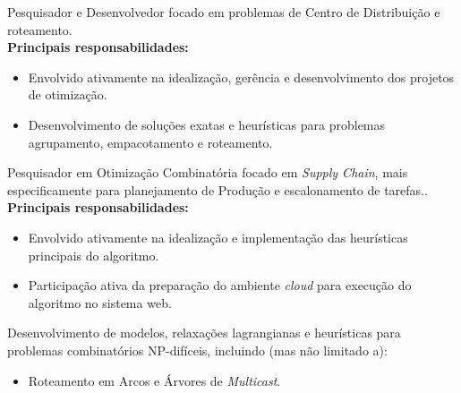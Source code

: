\documentclass[10pt,a4paper,ragged2e,withhyper]{altacv}
\begin{document}
\begin{paracol}{2}
            {Pesquisador e Desenvolvedor focado em problemas de Centro de Distribuição e roteamento}. \\
            \medskip
            \textbf{Principais responsabilidades:}
            \medskip
            \begin{itemize}
                \item Envolvido ativamente na idealização, gerência e desenvolvimento dos projetos de otimização.
                \item Desenvolvimento de soluções exatas e heurísticas para problemas agrupamento, empacotamento e roteamento. 
            \end{itemize}
        \divider
        \medskip
            {Pesquisador em Otimização Combinatória focado em \textit{Supply Chain}, mais especificamente para planejamento de Produção e escalonamento de tarefas.}.\\
            \medskip
            \textbf{Principais responsabilidades:}
            \medskip
            \begin{itemize}
                \item Envolvido ativamente na idealização e implementação das heurísticas principais do algoritmo.
                \item Participação ativa da preparação do ambiente \textit{cloud} para execução do algoritmo no sistema web.
            \end{itemize}
	    {Desenvolvimento de modelos, relaxações lagrangianas e heurísticas para problemas combinatórios NP-difíceis, incluindo (mas não limitado a):} \\
	      \begin{itemize}
		        \item Roteamento em Arcos e Árvores de \textit{Multicast}.
		  \end{itemize}
		\divider
        \begin{itemize}

\end{itemize}
\end{paracol}
\end{document}
